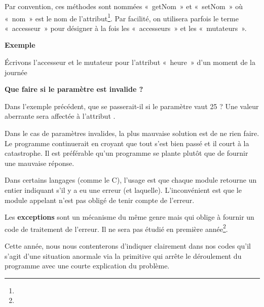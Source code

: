 {
Par convention, ces méthodes sont nommées «~getNom~» et «~setNom~» où
«~nom~» est le nom de
l'attribut\footnote{}. Par facilité, on utilisera parfois le terme «~accesseur~»
pour désigner à la fois les «~accesseurs~» et les «~mutateurs~».}

{\bfseries
Exemple}

{
Écrivons l'accesseur et le mutateur pour
l'attribut «~heure~» d'un moment de
la journée}


\bigskip


\bigskip

{\sffamily\bfseries\upshape
Que faire si le paramètre est invalide ? }

{
Dans l'exemple précédent, que se passerait-il si le
paramètre  vaut 25 ? Une valeur aberrante sera
affectée à l'attribut .}

{
Dans le cas de paramètres invalides, la plus mauvaise solution est de ne
rien faire. Le programme continuerait en croyant que tout s’est bien
passé et il court à la catastrophe. Il est préférable qu’un programme
se plante plutôt que de fournir une mauvaise réponse. }

{
Dans certains langages (comme le C), l’usage est que chaque module
retourne un entier indiquant s'il y a eu une erreur
(et laquelle). L’inconvénient est que le module appelant n’est pas
obligé de tenir compte de l’erreur.}

{
Les \textbf{exceptions} sont un mécanisme du même genre mais qui oblige
à fournir un code de traitement de l’erreur. Il ne sera pas étudié en
première année\footnote{}.
}

{
Cette année, nous nous contenterons d'indiquer
clairement dans nos codes qu'il
s'agit d'une situation anormale via
la primitive  qui arrête le déroulement du
programme avec une courte explication du problème.}

